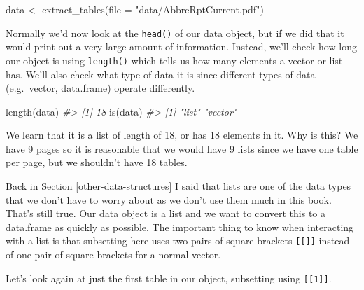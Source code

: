 \documentclass[
]{krantz}
\makeatletter
\newenvironment{Shaded}{\begin{snugshade}}{\end{snugshade}}
\newcommand{\AttributeTok}[1]{\textcolor[rgb]{0.61,0.61,0.61}{#1}}
\newcommand{\CommentTok}[1]{\textcolor[rgb]{0.37,0.37,0.37}{\textit{#1}}}
\newcommand{\FunctionTok}[1]{\textcolor[rgb]{0,0,0}{#1}}
\newcommand{\NormalTok}[1]{#1}
\newcommand{\OtherTok}[1]{\textcolor[rgb]{0.37,0.37,0.37}{#1}}
\newcommand{\StringTok}[1]{\textcolor[rgb]{0.5,0.5,0.5}{#1}}
\newenvironment{kframe}{%
\medskip{}
\setlength{\fboxsep}{.8em}
 \def\at@end@of@kframe{}%
 \ifinner\ifhmode%
  \def\at@end@of@kframe{\end{minipage}}%
  \begin{minipage}{\columnwidth}%
 \fi\fi%
 \def\FrameCommand##1{\hskip\@totalleftmargin \hskip-\fboxsep
 \colorbox{shadecolor}{##1}\hskip-\fboxsep
     \hskip-\linewidth \hskip-\@totalleftmargin \hskip\columnwidth}%
 \MakeFramed {\advance\hsize-\width
   \@totalleftmargin\z@ \linewidth\hsize
   \@setminipage}}%
 {\par\unskip\endMakeFramed%
 \at@end@of@kframe}
\renewenvironment{Shaded}{\begin{kframe}}{\end{kframe}}
\makeatother
\begin{document}
\begin{Shaded}
\begin{Highlighting}[]
\NormalTok{data }\OtherTok{\textless{}{-}} \FunctionTok{extract\_tables}\NormalTok{(}\AttributeTok{file =} \StringTok{"data/AbbreRptCurrent.pdf"}\NormalTok{)}
\end{Highlighting}
\end{Shaded}

Normally we'd now look at the \texttt{head()} of our data object, but if we did that it would print out a very large amount of information. Instead, we'll check how long our object is using \texttt{length()} which tells us how many elements a vector or list has. We'll also check what type of data it is since different types of data (e.g.~vector, data.frame) operate differently.

\begin{Shaded}
\begin{Highlighting}[]
\FunctionTok{length}\NormalTok{(data)}
\CommentTok{\#\textgreater{} [1] 18}
\FunctionTok{is}\NormalTok{(data)}
\CommentTok{\#\textgreater{} [1] "list"   "vector"}
\end{Highlighting}
\end{Shaded}

We learn that it is a list of length of 18, or has 18 elements in it. Why is this? We have 9 pages so it is reasonable that we would have 9 lists since we have one table per page, but we shouldn't have 18 tables.

Back in Section \ref{other-data-structures} I said that lists are one of the data types that we don't have to worry about as we don't use them much in this book. That's still true. Our data object is a list and we want to convert this to a data.frame as quickly as possible. The important thing to know when interacting with a list is that subsetting here uses two pairs of square brackets \texttt{{[}{[}{]}{]}} instead of one pair of square brackets for a normal vector.

Let's look again at just the first table in our object, subsetting using \texttt{{[}{[}1{]}{]}}.
\end{document}
